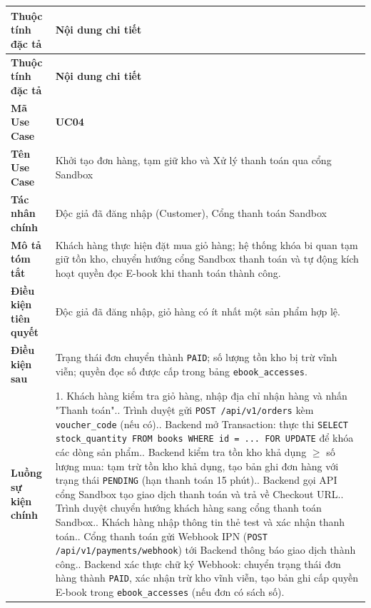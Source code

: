 \documentclass[11pt, a4paper]{report}
\begin{document}
\begin{longtable}{p{3.8cm} p{10.5cm}}
\toprule
\textbf{Thuộc tính đặc tả} & \textbf{Nội dung chi tiết} \\
\midrule
\endfirsthead
\toprule
\textbf{Thuộc tính đặc tả} & \textbf{Nội dung chi tiết} \\
\midrule
\endhead
\bottomrule
\endfoot
\textbf{Mã Use Case} & \textbf{UC04} \\
\midrule
\textbf{Tên Use Case} & Khởi tạo đơn hàng, tạm giữ kho và Xử lý thanh toán qua cổng Sandbox \\
\midrule
\textbf{Tác nhân chính} & Độc giả đã đăng nhập (Customer), Cổng thanh toán Sandbox \\
\midrule
\textbf{Mô tả tóm tắt} & Khách hàng thực hiện đặt mua giỏ hàng; hệ thống khóa bi quan tạm giữ tồn kho, chuyển hướng cổng Sandbox thanh toán và tự động kích hoạt quyền đọc E-book khi thanh toán thành công. \\
\midrule
\textbf{Điều kiện tiên quyết} & Độc giả đã đăng nhập, giỏ hàng có ít nhất một sản phẩm hợp lệ. \\
\midrule
\textbf{Điều kiện sau} & Trạng thái đơn chuyển thành \texttt{PAID}; số lượng tồn kho bị trừ vĩnh viễn; quyền đọc số được cấp trong bảng \texttt{ebook\_accesses}. \\
\midrule
\textbf{Luồng sự kiện chính} & 
1. Khách hàng kiểm tra giỏ hàng, nhập địa chỉ nhận hàng và nhấn "Thanh toán".\newline
2. Trình duyệt gửi \texttt{POST /api/v1/orders} kèm \texttt{voucher\_code} (nếu có).\newline
3. Backend mở Transaction: thực thi \texttt{SELECT stock\_quantity FROM books WHERE id = ... FOR UPDATE} để khóa các dòng sản phẩm.\newline
4. Backend kiểm tra tồn kho khả dụng $\ge$ số lượng mua: tạm trừ tồn kho khả dụng, tạo bản ghi đơn hàng với trạng thái \texttt{PENDING} (hạn thanh toán 15 phút).\newline
5. Backend gọi API cổng Sandbox tạo giao dịch thanh toán và trả về Checkout URL.\newline
6. Trình duyệt chuyển hướng khách hàng sang cổng thanh toán Sandbox.\newline
7. Khách hàng nhập thông tin thẻ test và xác nhận thanh toán.\newline
8. Cổng thanh toán gửi Webhook IPN (\texttt{POST /api/v1/payments/webhook}) tới Backend thông báo giao dịch thành công.\newline
9. Backend xác thực chữ ký Webhook: chuyển trạng thái đơn hàng thành \texttt{PAID}, xác nhận trừ kho vĩnh viễn, tạo bản ghi cấp quyền E-book trong \texttt{ebook\_accesses} (nếu đơn có sách số).\newline

\end{longtable}
\end{document}
